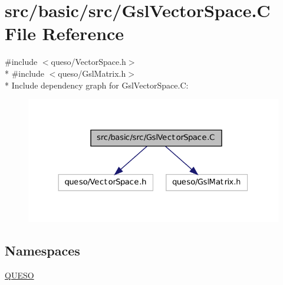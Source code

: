 \hypertarget{_gsl_vector_space_8_c}{\section{src/basic/src/\-Gsl\-Vector\-Space.C File Reference}
\label{_gsl_vector_space_8_c}
}
{\ttfamily \#include $<$queso/\-Vector\-Space.\-h$>$}\\*
{\ttfamily \#include $<$queso/\-Gsl\-Matrix.\-h$>$}\\*
Include dependency graph for Gsl\-Vector\-Space.\-C\-:
\nopagebreak
\begin{figure}[H]
\begin{center}
\leavevmode
\includegraphics[width=326pt]{_gsl_vector_space_8_c__incl}
\end{center}
\end{figure}
\subsection*{Namespaces}
\begin{DoxyCompactItemize}
\item 
\hyperlink{namespace_q_u_e_s_o}{Q\-U\-E\-S\-O}
\end{DoxyCompactItemize}
